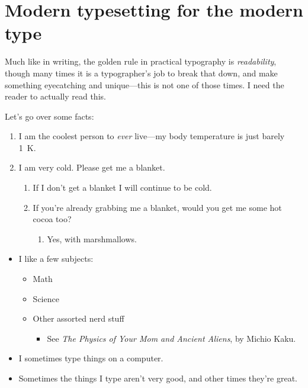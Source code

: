 \documentclass[%
	english,%
	 a4paper,%
	titlepage,%
	fleqn]{article}
\providecommand{\tightlist}{%
  \setlength{\itemsep}{0pt}\setlength{\parskip}{0pt}}
\begin{document}
\hypertarget{modern-typesetting-for-the-modern-type}{%
\section{Modern typesetting for the modern
type}\label{modern-typesetting-for-the-modern-type}}

Much like in writing, the golden rule in practical typography is
\emph{readability}, though many times it is a typographer's job to break
that down, and make something eyecatching and unique---this is not one
of those times. I need the reader to actually read this.

Let's go over some facts:

\begin{enumerate}
\tightlist
\item
  I am the coolest person to \emph{ever} live---my body temperature is
  just barely \qty{1}{\kelvin}.
\item
  I am very cold. Please get me a blanket.

  \begin{enumerate}
  \tightlist
  \item
    If I don't get a blanket I will continue to be cold.
  \item
    If you're already grabbing me a blanket, would you get me some hot
    cocoa too?

    \begin{enumerate}
    \tightlist
    \item
      Yes, with marshmallows.
    \end{enumerate}
  \end{enumerate}
\end{enumerate}

\begin{itemize}
\tightlist
\item
  I like a few subjects:

  \begin{itemize}
  \tightlist
  \item
    Math
  \item
    Science
  \item
    Other assorted nerd stuff

    \begin{itemize}
    \tightlist
    \item
      See \emph{The Physics of Your Mom and Ancient Aliens}, by Michio
      Kaku.
    \end{itemize}
  \end{itemize}
\item
  I sometimes type things on a computer.
\item
  Sometimes the things I type aren't very good, and other times they're
  great.
\end{itemize}
\end{document}
